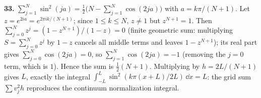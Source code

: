 \textbf{33.} $\sum_{j=1}^N\sin^2(ja)=\tfrac12\bigl(N-\sum_{j=1}^N\cos(2ja)\bigr)$ with $a=k\pi/(N+1)$. Let $z=e^{2ia}=e^{2\pi ik/(N+1)}$; since $1\le k\le N$, $z\ne1$ but $z^{N+1}=1$. Then $\sum_{j=0}^Nz^j=(1-z^{N+1})/(1-z)=0$ (finite geometric sum: multiplying $S=\sum_{j=0}^Nz^j$ by $1-z$ cancels all middle terms and leaves $1-z^{N+1}$); its real part gives $\sum_{j=0}^N\cos(2ja)=0$, so $\sum_{j=1}^N\cos(2ja)=-1$ (removing the $j=0$ term, which is $1$). Hence the sum is $\tfrac12(N+1)$. Multiplying by $h=2L/(N+1)$ gives $L$, exactly the integral $\int_{-L}^L\sin^2(k\pi(x+L)/2L)\,\dd x=L$: the grid sum $\sum v_j^2h$ reproduces the continuum normalization integral.
